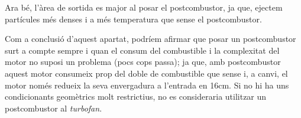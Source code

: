 \noindent Ara bé, l'àrea de sortida es major al posar el postcombustor, ja que, ejectem partícules més denses i a més temperatura que sense el postcombustor.

\noindent Com a conclusió d'aquest apartat, podríem afirmar que posar un postcombustor surt a compte sempre i quan el consum del combustible i la complexitat del motor no suposi un problema (pocs cops passa); ja que, amb postcombustor aquest motor consumeix prop del doble de combustible que sense i, a canvi, el motor només redueix la seva envergadura a l'entrada en 16cm. Si no hi ha uns condicionants geomètrics molt restrictius, no es consideraria utilitzar un postcombustor al \textit{turbofan}. 

